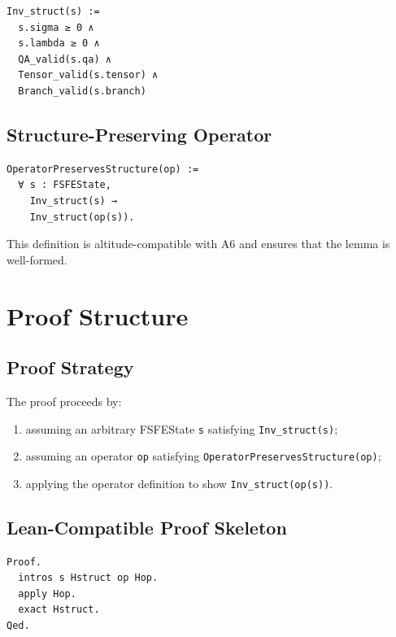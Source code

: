\documentclass[11pt]{article}
\begin{document}
\begin{verbatim}
Inv_struct(s) :=
  s.sigma ≥ 0 ∧
  s.lambda ≥ 0 ∧
  QA_valid(s.qa) ∧
  Tensor_valid(s.tensor) ∧
  Branch_valid(s.branch)
\end{verbatim}

\subsection{Structure-Preserving Operator}

\begin{verbatim}
OperatorPreservesStructure(op) :=
  ∀ s : FSFEState,
    Inv_struct(s) →
    Inv_struct(op(s)).
\end{verbatim}

This definition is altitude-compatible with A6 and ensures that the lemma is
well-formed.

\newpage


\section{Proof Structure}

\subsection{Proof Strategy}

The proof proceeds by:

\begin{enumerate}
  \item assuming an arbitrary FSFEState \texttt{s} satisfying \texttt{Inv_struct(s)};
  \item assuming an operator \texttt{op} satisfying \texttt{OperatorPreservesStructure(op)};
  \item applying the operator definition to show \texttt{Inv_struct(op(s))}.
\end{enumerate}

\subsection{Lean-Compatible Proof Skeleton}

\begin{verbatim}
Proof.
  intros s Hstruct op Hop.
  apply Hop.
  exact Hstruct.
Qed.
\end{verbatim}
\end{document}

